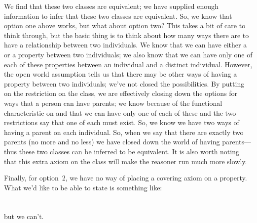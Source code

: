 
We find that these two classes are equivalent; we have supplied enough information to infer that these two classes are equivalent. So, we know that option one above works, but what about option two? \herebedragons
This takes a bit of care to think through, but the  basic thing is to think about how many ways there are to have a  relationship between two individuals. We know that we can have either a  or a  property between two individuals; we also know that we can have only one of each of these properties between an individual and a distinct individual. However, the open world assumption tells us that there may be other ways of having a  property between two individuals; we've not closed the possibilities. By putting on the  restriction on the \person class, we are effectively closing down the options for ways that a person can have parents; we know because of the functional characteristic on  and  that we can have only one of each of these and the two restrictions say that one of each must exist. So, we know we have two ways of having a parent on each \person individual. So, when we say that there are exactly two parents (no more and no less) we have closed down the world of having parents---thus these two classes can be inferred  to be equivalent. It is also worth noting that this extra axiom on the \person class will make the reasoner run much more slowly.

Finally, for option~2, we have no way of placing a covering axiom on a property. What we'd like to be able to state is something like:
\\\\
\\
\noindent but we can't.

